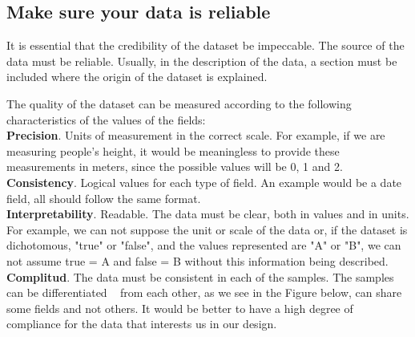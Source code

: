 \subsection{Make sure your data is reliable}

It is essential that the credibility of the dataset be impeccable. The source of the data must be reliable.
Usually, in the description of the data, a section must be included where the origin of the dataset is explained.

The quality of the dataset can be measured according to the following characteristics of the values of the fields: \\
 
\textbf{Precision}. Units of measurement in the correct scale. For example, if we are measuring people's height, it 
would be meaningless to provide these measurements in meters, since the possible values will be 0, 1 and 2. \\

\textbf{Consistency}. Logical values for each type of field. An example would be a date field, all should
follow the same format. \\

\textbf{Interpretability}. Readable. The data must be clear, both in values and in units. For example, we can not
suppose the unit or scale of the data or, if the dataset is dichotomous, "true" or "false", and the values represented are
"A" or "B", we can not assume true = A and false = B without this information being described. \\

\textbf{Complitud}. The data must be consistent in each of the samples. The samples can be differentiated
  from each other, as we see in the Figure below, can share some fields and not others. It would be
better to have a high degree of compliance for the data that interests us in our design.


